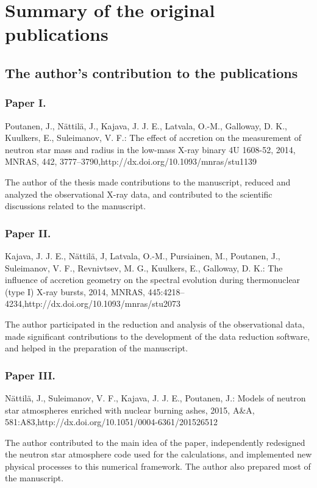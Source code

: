 \chapter{Summary of the original publications}




\section{The author's contribution to the publications} 

\subsection{Paper I.}
Poutanen, J., Nättilä, J., Kajava, J. J. E., Latvala, O.-M., Galloway, D. K., Kuulkers, E., Suleimanov, V. F.: The effect of accretion on the measurement of neutron star mass and radius in the low-mass X-ray binary 4U 1608-52, 2014, MNRAS, 442, 3777–3790,http://dx.doi.org/10.1093/mnras/stu1139

The author of the thesis made contributions to the manuscript, reduced and analyzed the observational X-ray data, and contributed to the scientific discussions related to the manuscript.


\subsection{Paper II.}
Kajava, J. J. E., Nättilä, J, Latvala, O.-M., Pursiainen, M., Poutanen, J., Suleimanov, V. F., Revnivtsev, M. G., Kuulkers, E., Galloway, D. K.: The influence of accretion geometry on the spectral evolution during thermonuclear (type I) X-ray bursts, 2014, MNRAS, 445:4218–4234,http://dx.doi.org/10.1093/mnras/stu2073

The author participated in the reduction and analysis of the observational data, made significant contributions to the development of the data reduction software, and helped in the preparation of the manuscript.


\subsection{Paper III.}
Nättilä, J., Suleimanov, V. F., Kajava, J. J. E., Poutanen, J.: Models of neutron star atmospheres enriched with nuclear burning ashes, 2015, A&A, 581:A83,http://dx.doi.org/10.1051/0004-6361/201526512

The author contributed to the main idea of the paper, independently redesigned the neutron star atmosphere code used for the calculations, and implemented new physical processes to this numerical framework. 
The author also prepared most of the manuscript.


